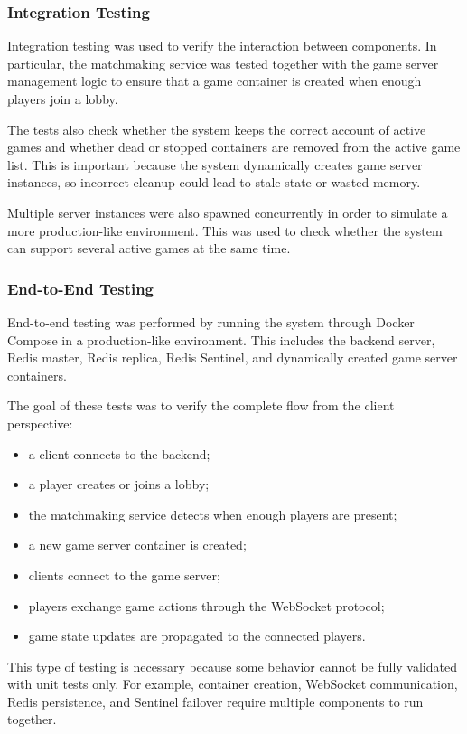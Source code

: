 \documentclass{scrartcl}
\begin{document}
\subsubsection{Integration Testing}

Integration testing was used to verify the interaction between components. In particular, the matchmaking service was tested together with the game server management logic to ensure that a game container is created when enough players join a lobby.

The tests also check whether the system keeps the correct account of active games and whether dead or stopped containers are removed from the active game list. This is important because the system dynamically creates game server instances, so incorrect cleanup could lead to stale state or wasted memory.

Multiple server instances were also spawned concurrently in order to simulate a more production-like environment. This was used to check whether the system can support several active games at the same time.

\subsubsection{End-to-End Testing}

End-to-end testing was performed by running the system through Docker Compose in a production-like environment. This includes the backend server, Redis master, Redis replica, Redis Sentinel, and dynamically created game server containers.

The goal of these tests was to verify the complete flow from the client perspective:

\begin{itemize}
    \item a client connects to the backend;
    \item a player creates or joins a lobby;
    \item the matchmaking service detects when enough players are present;
    \item a new game server container is created;
    \item clients connect to the game server;
    \item players exchange game actions through the WebSocket protocol;
    \item game state updates are propagated to the connected players.
\end{itemize}

This type of testing is necessary because some behavior cannot be fully validated with unit tests only. For example, container creation, WebSocket communication, Redis persistence, and Sentinel failover require multiple components to run together.
\end{document}
